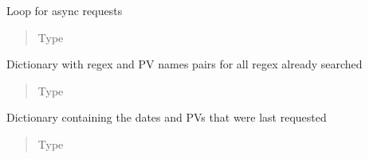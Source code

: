 \documentclass[letterpaper,10pt,english]{sphinxmanual}
\begin{document}
\begin{fulllineitems}
\begin{fulllineitems}
\begin{quote}
\begin{description}
\end{description}\end{quote}

\end{fulllineitems}


\begin{fulllineitems}
\label{\detokenize{dataset:dataset.Dataset.loop}}
\sphinxAtStartPar
Loop for async requests
\begin{quote}\begin{description}
\item[{Type}] \leavevmode
\sphinxAtStartPar
{}

\end{description}\end{quote}

\end{fulllineitems}


\begin{fulllineitems}
\label{\detokenize{dataset:dataset.Dataset.last_searches}}
\sphinxAtStartPar
Dictionary with regex and PV names pairs for all regex already searched
\begin{quote}\begin{description}
\item[{Type}] \leavevmode
\sphinxAtStartPar
{}

\end{description}\end{quote}

\end{fulllineitems}


\begin{fulllineitems}
\label{\detokenize{dataset:dataset.Dataset.last_dataset_metadata}}
\sphinxAtStartPar
Dictionary containing the dates and PVs that were last requested
\begin{quote}\begin{description}
\item[{Type}] \leavevmode
\sphinxAtStartPar
{}


\end{description}
\end{quote}
\end{fulllineitems}
\end{fulllineitems}
\end{document}
